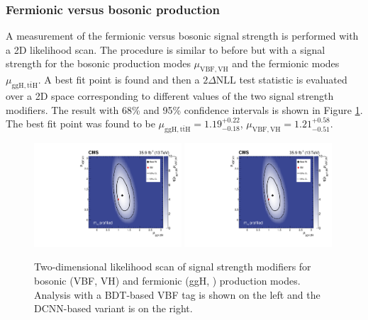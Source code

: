 \subsubsection{Fermionic versus bosonic production}
A measurement of the fermionic versus bosonic signal strength is performed with a 2D likelihood scan.
The procedure is similar to before but with a signal strength for the bosonic production modes $\mu_{\mathrm{VBF},\mathrm{VH}}$ and the fermionic modes $\mu_{\mathrm{ggH},\mathrm{t\bar{t}H}}$.
A best fit point is found and then a $2\Delta\mathrm{NLL}$ test statistic is evaluated over a 2D space corresponding to different values of the two signal strength modifiers. 
The result with 68\% and 95\% confidence intervals is shown in Figure \ref{fig:stats_results:fermionic_bosonic}. 
The best fit point was found to be $\mu_{\mathrm{ggH},\mathrm{t\bar{t}H}} = 1.19^{+0.22}_{-0.18}$, $\mu_{\mathrm{VBF},\mathrm{VH}} = 1.21^{+0.58}_{-0.51}$.
\begin{figure}[h!]
    \begin{center}
        \includegraphics[width=0.49\textwidth]{figures/stats_results/CMS-HIG-16-040_Figure_019.pdf}
        \includegraphics[width=0.49\textwidth]{figures/stats_results/CMS-HIG-16-040_Figure_019.pdf}
    \end{center}
    \caption{Two-dimensional likelihood scan of signal strength modifiers for bosonic (VBF, VH) and fermionic (ggH, \ttH) production modes. Analysis with a BDT-based VBF tag is shown on the left and the DCNN-based variant is on the right.}
        \label{fig:stats_results:fermionic_bosonic}
\end{figure}

